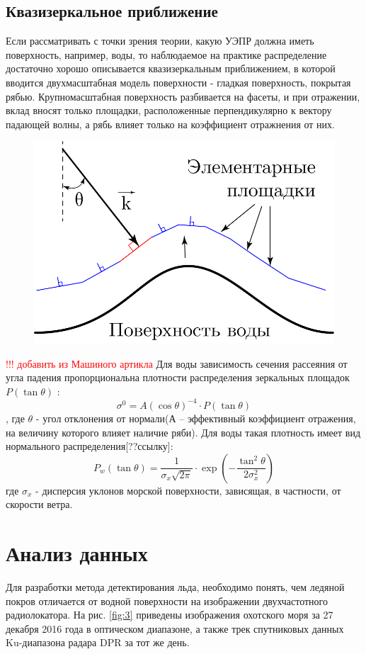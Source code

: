 \subsection{Квазизеркальное приближение}
Если рассматривать с точки зрения теории, какую УЭПР должна иметь поверхность, например, воды, то наблюдаемое на
практике распределение достаточно хорошо описывается квазизеркальным приближением, в которой вводится двухмасштабная
модель поверхности - гладкая поверхность, покрытая рябью. Крупномасштабная поверхность разбивается на
фасеты, и при отражении, вклад вносят только площадки, расположенные перпендикулярно к вектору падающей волны, а рябь
влияет только на коэффициент отражнения от них.

\begin{figure}[h!]
  \centering
  \includegraphics[width = .45\linewidth]{img/kvaz.png}
  \caption{}
  \label{fig:2}
\end{figure}

\textcolor{red}{!!! добавить из Машиного артикла}
Для воды зависимость сечения рассеяния от угла падения пропорциональна плотности распределения зеркальных площадок
$P(\tan \theta)$  \cite{bassfuks}:
\begin{equation}
  \sigma^0 = A (\cos \theta)^{-4} \cdot P(\tan \theta)
  \label{eq:3}
\end{equation}
, где $\theta$ - угол отклонения от нормали(А – эффективный коэффициент отражения, на величину которого влияет наличие
ряби). Для воды такая плотность имеет вид нормального распределения[??ссылку]:
\begin{equation}
  P_w(\tan \theta) = \frac{1}{\sigma_x \sqrt{2 \pi}} \cdot \exp (- \frac{\tan^2\theta}{2 \sigma^2_x})
  \label{eq:4}
\end{equation}
где $\sigma_x$ - дисперсия уклонов морской поверхности, зависящая, в частности, от скорости ветра.

\section{Анализ данных}
Для разработки метода детектирования льда, необходимо понять, чем ледяной покров отличается от водной поверхности на
изображении двухчастотного радиолокатора. На рис. \ref{fig:3} приведены изображения охотского моря за 27 декабря 2016
года в оптическом диапазоне, а также трек спутниковых данных Ku-диапазона радара DPR за тот же день.

